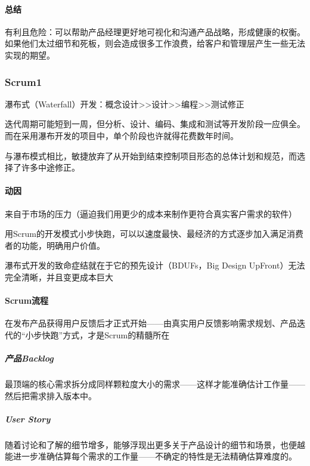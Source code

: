\documentclass[letterpaper,11pt,english]{sphinxmanual}
\begin{document}
\paragraph{总结}
\label{\detokenize{chapter_project/Roadmap:id5}}
有利且危险：可以帮助产品经理更好地可视化和沟通产品战略，形成健康的权衡。如果他们太过细节和死板，则会造成很多工作浪费，给客户和管理层产生一些无法实现的期望。


\subsubsection{Scrum1\sphinxfootnotemark[277]}
\label{\detokenize{chapter_project/Scrum:scrum1}}\label{\detokenize{chapter_project/Scrum::doc}}%
\begin{footnotetext}[277]\sphinxAtStartFootnote
{}
%
\end{footnotetext}\ignorespaces 
瀑布式（Waterfall）开发：概念设计>>设计>>编程>>测试修正

迭代周期可能短到一周，但分析、设计、编码、集成和测试等开发阶段一应俱全。而在采用瀑布开发的项目中，单个阶段也许就得花费数年时间。

与瀑布模式相比，敏捷放弃了从开始到结束控制项目形态的总体计划和规范，而选择了许多中途修正。


\paragraph{动因}
\label{\detokenize{chapter_project/Scrum:id1}}
来自于市场的压力（逼迫我们用更少的成本来制作更符合真实客户需求的软件）

用Scrum的开发模式小步快跑，可以以速度最快、最经济的方式逐步加入满足消费者的功能，明确用户价值。

瀑布式开发的致命症结就在于它的预先设计（BDUFs，Big Design
Up\sphinxhyphen{}Front）无法完全清晰，并且变更成本巨大


\paragraph{Scrum流程}
\label{\detokenize{chapter_project/Scrum:scrum}}
在发布产品获得用户反馈后才正式开始——由真实用户反馈影响需求规划、产品迭代的“小步快跑”方式，才是Scrum的精髓所在


\subparagraph{产品Backlog}
\label{\detokenize{chapter_project/Scrum:backlog}}
最顶端的核心需求拆分成同样颗粒度大小的需求——这样才能准确估计工作量——然后把需求排入版本中。


\subparagraph{User Story}
\label{\detokenize{chapter_project/Scrum:user-story}}
随着讨论和了解的细节增多，能够浮现出更多关于产品设计的细节和场景，也便越能进一步准确估算每个需求的工作量——不确定的特性是无法精确估算难度的。
\end{document}
